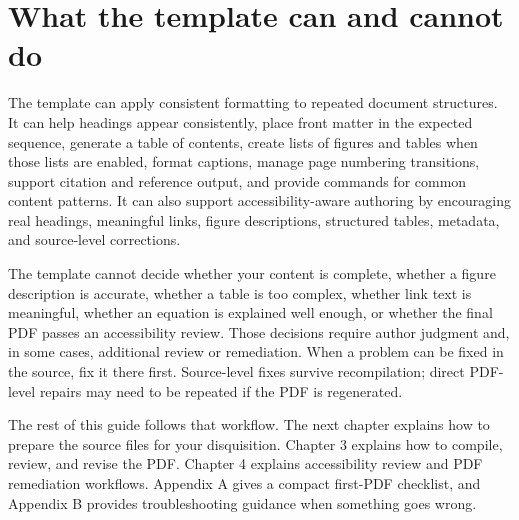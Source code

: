 \section{What the template can and cannot do}
\label{sec:template-limits}

The template can apply consistent formatting to repeated document structures. It can help headings appear consistently, place front matter in the expected sequence, generate a table of contents, create lists of figures and tables when those lists are enabled, format captions, manage page numbering transitions, support citation and reference output, and provide commands for common content patterns. It can also support accessibility-aware authoring by encouraging real headings, meaningful links, figure descriptions, structured tables, metadata, and source-level corrections.

The template cannot decide whether your content is complete, whether a figure description is accurate, whether a table is too complex, whether link text is meaningful, whether an equation is explained well enough, or whether the final PDF passes an accessibility review. Those decisions require author judgment and, in some cases, additional review or remediation. When a problem can be fixed in the source, fix it there first. Source-level fixes survive recompilation; direct PDF-level repairs may need to be repeated if the PDF is regenerated.

The rest of this guide follows that workflow. The next chapter explains how to prepare the source files for your disquisition. Chapter 3 explains how to compile, review, and revise the PDF. Chapter 4 explains accessibility review and PDF remediation workflows. Appendix A gives a compact first-PDF checklist, and Appendix B provides troubleshooting guidance when something goes wrong.

